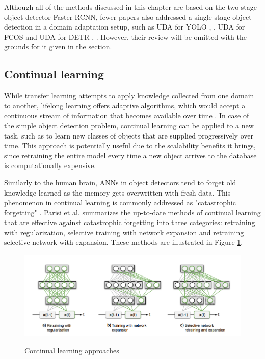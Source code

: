 \documentclass[english, 12pt, a4paper, elec, utf8, a-1b, online]{aaltothesis}
\begin{document}
Although all of the methods discussed in this chapter are based on the two-stage object detector Faster-RCNN, fewer papers also addressed a single-stage object detection in a domain adaptation setup, such as UDA for YOLO \cite{Hnewa2021}, \cite{Zhang2021a}, UDA for FCOS \cite{fcos1} and UDA for DETR \cite{Zhang2021b}, \cite{Vidit2021}. However, their review will be omitted with the grounds for it given in the  section. 

\subsection{Continual learning}
While transfer learning attempts to apply knowledge collected from one domain to another, lifelong learning offers adaptive algorithms, which  would accept a continuous stream of information that becomes available over time \cite{Parisi2018}. In case of the simple object detection problem, continual learning can be applied to a new task, such as to learn new classes of objects that are supplied progressively over time. This approach is potentially useful due to the scalability benefits it brings, since retraining the entire model every time a new object arrives to the database is computationally expensive. 

Similarly to the human brain, ANNs in object detectors tend to forget old knowledge learned as the memory gets overwritten with fresh data. This phenomenon in continual learning is commonly addressed as "catastrophic forgetting" \cite{Parisi2018}. Parisi et al. summarizes the up-to-date methods of continual learning that are effective against catastrophic forgetting into three categories: retraining with regularization, selective training with network expansion and retraining selective network with expansion. These methods are illustrated in Figure \ref{continual}. 

\begin{figure}[htb]
	\begin{center}
		\includegraphics[width=16cm]{./continual.png}
	\end{center}
	\caption{Continual learning approaches
\cite{Parisi2018}}
	\begin{center}
		\label{continual}
	\end{center}
\end{figure}
\FloatBarrier
\end{document}
